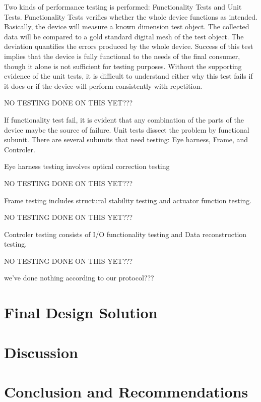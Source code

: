 \documentclass{article}
\begin{document}
Two kinds of performance testing is performed: Functionality Tests and Unit Tests. Functionality Tests 
verifies whether the whole device functions as intended. Basically, the device will measure a known 
dimension test object. The collected data will be compared to a gold standard digital mesh of the test 
object. The deviation quantifies the errors produced by the whole device. Success of this test implies that 
the device is fully functional to the needs of the final consumer, though it alone is not sufficient for testing 
purposes. Without the supporting evidence of the unit tests, it is difficult to understand either why this test 
fails if it does or if the device will perform consistently with repetition.

NO TESTING DONE ON  THIS YET???

If functionality test fail, it is evident that any combination of the parts of the device maybe the source of 
failure. Unit tests dissect the problem by functional subunit. There are several subunits that need testing: 
Eye harness, Frame, and Controler. 

Eye harness testing involves optical correction testing

NO TESTING DONE ON  THIS YET???

Frame testing includes structural stability testing and actuator function testing.

NO TESTING DONE ON  THIS YET???

Controler testing consists of I/O functionality testing and Data reconstruction testing.

NO TESTING DONE ON  THIS YET???


we've done nothing according to our protocol???



\section{Final Design Solution}
\label{sec:final-design-solut}

\section{Discussion}
\label{sec:discussion}

\section{Conclusion and Recommendations}
\label{sec:concl-recomm}

\newpage
{}


\end{document}
